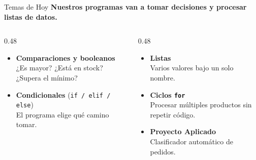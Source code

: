 \documentclass[aspectratio=169, 11pt]{beamer}
\begin{document}
\begin{frame}{Temas de Hoy}
  \vspace{-6pt}
  {\small\color{arcaDark}\bfseries
    Nuestros programas van a tomar decisiones y procesar listas de datos.}

  \vspace{10pt}
  \begin{columns}[T]
    \begin{column}{0.48\textwidth}
      {\footnotesize
      \begin{itemize}\setlength{\itemsep}{7pt}
        \item[{\color{arcaRed}\Large\faBalanceScale}]
          \textbf{Comparaciones y booleanos}\\
          {\scriptsize\color{textMuted}
            ¿Es mayor? ¿Está en stock? ¿Supera el mínimo?}

        \item[{\color{arcaRed}\Large\faCodeBranch}]
          \textbf{Condicionales} (\texttt{if / elif / else})\\
          {\scriptsize\color{textMuted}
            El programa elige qué camino tomar.}
      \end{itemize}
      }
    \end{column}

    \begin{column}{0.48\textwidth}
      {\footnotesize
      \begin{itemize}\setlength{\itemsep}{7pt}
        \item[{\color{arcaRed}\Large\faList}]
          \textbf{Listas}\\
          {\scriptsize\color{textMuted}
            Varios valores bajo un solo nombre.}

        \item[{\color{arcaRed}\Large\faSync}]
          \textbf{Ciclos \texttt{for}}\\
          {\scriptsize\color{textMuted}
            Procesar múltiples productos sin repetir código.}

        \item[{\color{arcaRed}\Large\faRocket}]
          \textbf{Proyecto Aplicado}\\
          {\scriptsize\color{textMuted}
            Clasificador automático de pedidos.}
      \end{itemize}
      }
    \end{column}
  \end{columns}
\end{frame}
\end{document}
